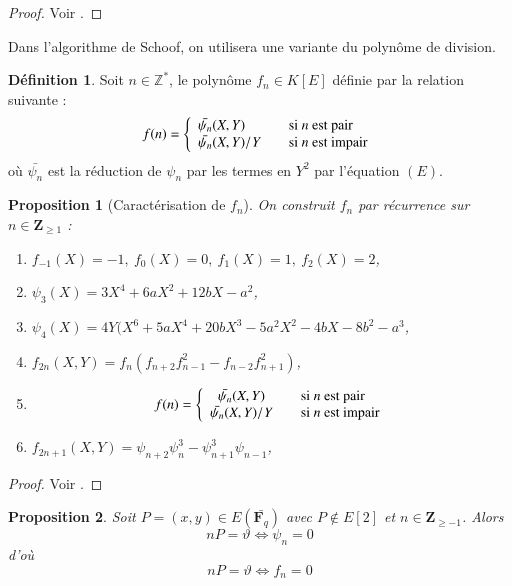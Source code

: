 \documentclass{article}%
\theoremstyle{plain}
\theoremstyle{definition}
\newtheorem{definition}{Définition}[section]
\theoremstyle{plain}
\newtheorem{proposition}{Proposition}[section]
\theoremstyle{plain}
\theoremstyle{remark}
\newcommand\fq{\mathbf{F}_{q}}
\begin{document}
\begin{proof}
Voir \cite{ref4}.
\end{proof}

Dans l'algorithme de Schoof, on utilisera une variante du polynôme de division.

\begin{definition}
Soit $n\in\mathbb{Z}^{*}$, le polynôme $f_{n}\in K[E]$ définie par la relation suivante : 
$$
f(n) = \left\{
\begin{array}{l l}
  \bar{\psi_{n}}(X,Y) & \quad \text{si } n \text{ est pair}\\
  \bar{\psi_{n}}(X,Y)/Y & \quad \text{si } n \text{ est impair}\\ \end{array} \right.
$$
où $\bar{\psi_{n}}$ est la réduction de $\psi_{n}$ par les termes en $Y^{2}$ par l'équation $(E)$.
\end{definition}

\begin{proposition}[Caractérisation de $f_{n}$]
On construit $f_{n}$ par récurrence sur $n\in\mathbf{Z}_{\geq 1}$ :
\begin{enumerate}
\item $f_{-1}(X)=-1,\ f_{0}(X)=0,\ f_{1}(X)=1,\ f_{2}(X)=2$,
\item $\psi_{3}(X)=3X^{4} + 6aX^{2} + 12bX - a^{2}$,
\item $\psi_{4}(X)=4Y(X^{6} + 5aX^{4} + 20bX^{3} - 5a^{2}X^{2} - 4bX - 8b^{2} - a^{3}$,
\item $f_{2n}(X,Y)=f_{n}(f_{n+2}f_{n-1}^{2} - f_{n-2}f_{n+1}^{2})$,
\item $$
f(n) = \left\{ 
\begin{array}{cl cl}
  \bar{\psi_{n}}(X,Y) & \quad \text{si } n \text{ est pair}\\
  \bar{\psi_{n}}(X,Y)/Y & \quad \text{si } n \text{ est impair}\\ \end{array} \right.
$$
\item $f_{2n+1}(X,Y)=\psi_{n+2}\psi_{n}^{3} - \psi_{n+1}^{3}\psi_{n-1}$,
\end{enumerate}
\end{proposition}

\begin{proof}
Voir \cite{ref4}.
\end{proof}

\begin{proposition}
Soit $P=(x,y)\in E(\bar{\fq})$ avec $P\notin E[2]$ et $n\in\mathbf{Z}_{\geq -1}$. Alors 
\begin{equation}
nP = \vartheta \Longleftrightarrow \psi_{n} = 0
\label{np}
\end{equation}
d'où
\begin{equation}
nP = \vartheta \Longleftrightarrow f_{n} = 0
\label{np1}
\end{equation}
\end{proposition}
\end{document}
